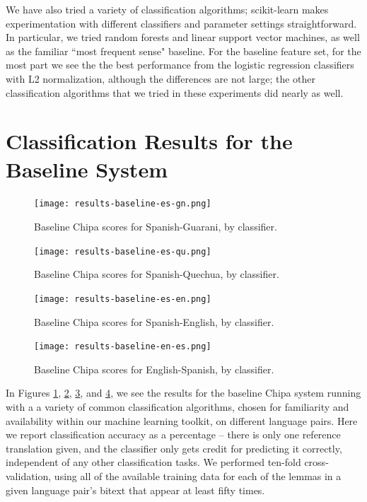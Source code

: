 We have also tried a variety of classification algorithms; scikit-learn makes
experimentation with different classifiers and parameter settings
straightforward. In particular, we tried random forests and linear support
vector machines, as well as the familiar ``most frequent sense" baseline. For
the baseline feature set, for the most part we see the the best performance
from the logistic regression classifiers with L2 normalization, although the
differences are not large; the other classification algorithms that we tried in
these experiments did nearly as well.

\section{Classification Results for the Baseline System}

\begin{figure}
  \texttt{[image: results-baseline-es-gn.png]}
  \caption{Baseline Chipa scores for Spanish-Guarani, by classifier.}
  \label{fig:esgnresults:baseline}
\end{figure}

\begin{figure}
  \texttt{[image: results-baseline-es-qu.png]}
  \caption{Baseline Chipa scores for Spanish-Quechua, by classifier.}
  \label{fig:esquresults:baseline}
\end{figure}

\begin{figure}
  \texttt{[image: results-baseline-es-en.png]}
  \caption{Baseline Chipa scores for Spanish-English, by classifier.}
  \label{fig:esenresults:baseline}
\end{figure}

\begin{figure}
  \texttt{[image: results-baseline-en-es.png]}
  \caption{Baseline Chipa scores for English-Spanish, by classifier.}
  \label{fig:enesresults:baseline}
\end{figure}

In Figures \ref{fig:esgnresults:baseline}, \ref{fig:esquresults:baseline},
\ref{fig:esenresults:baseline}, and \ref{fig:enesresults:baseline}, we see the
results for the baseline Chipa system running with a a variety of common
classification algorithms, chosen for familiarity and availability within our
machine learning toolkit, on different language pairs. Here we report
classification accuracy as a percentage -- there is only one reference
translation given, and the classifier only gets credit for predicting it
correctly, independent of any other classification tasks. We performed ten-fold
cross-validation, using all of the available training data for each of the
lemmas in a given language pair's bitext that appear at least fifty times.

